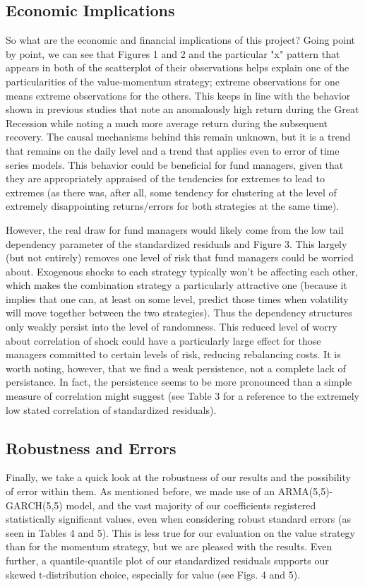 \documentclass[12pt,letterpaper]{memoir}
\begin{document}
\subsection*{Economic Implications}
So what are the economic and financial implications of this project? Going point by point, we can see that Figures 1 and 2 and the particular "x" pattern that appears in both of the scatterplot of their observations helps explain one of the particularities of the value-momentum strategy; extreme observations for one means extreme observations for the others. This keeps in line with the behavior shown in previous studies that note an anomalously high return during the Great Recession while noting a much more average return during the subsequent recovery. The causal mechanisms behind this remain unknown, but it is a trend that remains on the daily level and a trend that applies even to error of time series models. This behavior could be beneficial for fund managers, given that they are appropriately appraised of the tendencies for extremes to lead to extremes (as there was, after all, some tendency for clustering at the level of extremely disappointing returns/errors for both strategies at the same time).

However, the real draw for fund managers would likely come from the low tail dependency parameter of the standardized residuals and Figure 3. This largely (but not entirely) removes one level of risk that fund managers could be worried about. Exogenous shocks to each strategy typically won't be affecting each other, which makes the combination strategy a particularly attractive one (because it implies that one can, at least on some level, predict those times when volatility will move together between the two strategies). Thus the dependency structures only weakly persist into the level of randomness. This reduced level of worry about correlation of shock could have a particularly large effect for those managers committed to certain levels of risk, reducing rebalancing costs. It is worth noting, however, that we find a weak persistence, not a complete lack of persistance. In fact, the persistence seems to be more pronounced than a simple measure of correlation might suggest (see Table 3 for a reference to the extremely low stated correlation of standardized residuals).
\subsection*{Robustness and Errors}
Finally, we take a quick look at the robustness of our results and the possibility of error within them. As mentioned before, we made use of an ARMA(5,5)-GARCH(5,5) model, and the vast majority of our coefficients registered statistically significant values, even when considering robust standard errors (as seen in Tables 4 and 5). This is less true for our evaluation on the value strategy than for the momentum strategy, but we are pleased with the results. Even further, a quantile-quantile plot of our standardized residuals supports our skewed t-distribution choice, especially for value (see Figs. 4 and 5). 
\end{document}
